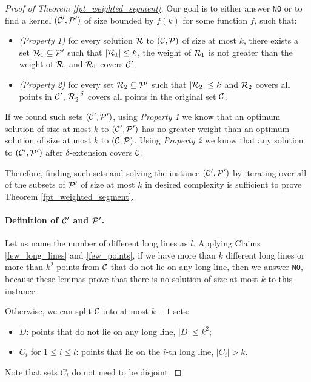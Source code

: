 \begin{proof}[Proof of Theorem \ref{fpt_weighted_segment}]
Our goal is to either answer \texttt{NO} or to find a kernel
$(\mathcal{C}',\mathcal{P}')$ of size bounded by $f(k)$ for some function $f$, such that:
\begin{itemize}
\item \textit{(Property 1)} for every solution
$\mathcal{R}$ to $(\mathcal{C},\mathcal{P})$ of size at most $k$,
there exists a set $\mathcal{R}_1 \subseteq \mathcal{P}'$ such that
$|\mathcal{R}_1| \le k$, the weight of $\mathcal{R}_1$ is not greater than the weight of $\mathcal{R}$,
and $\mathcal{R}_1$ covers $\mathcal{C}'$;
\item \textit{(Property 2)}
for every set $\mathcal{R}_2 \subseteq \mathcal{P}'$ such that $|\mathcal{R}_2| \le k$
and $\mathcal{R}_2$ covers all points in $\mathcal{C}'$, $\mathcal{R}_2^{+\delta}$
covers all points in the original set $\mathcal{C}$.
\end{itemize}

If we found such sets $(\mathcal{C}',\mathcal{P}')$,
using \textit{Property 1} we know that an optimum solution 
of size at most $k$ to $(\mathcal{C}',\mathcal{P}')$
has no greater weight than an optimum solution
of size at most $k$ to $(\mathcal{C},\mathcal{P})$.
Using \textit{Property 2} we know that
any solution to $(\mathcal{C}',\mathcal{P}')$
after $\delta$-extension covers $\mathcal{C}$.

Therefore, finding such sets 
and solving the instance $(\mathcal{C}',\mathcal{P}')$
by iterating over all of the subsets of $\mathcal{P}'$
of size at most $k$
in desired complexity
is sufficient to prove Theorem \ref{fpt_weighted_segment}.

\paragraph{Definition of $\mathcal{C}'$ and $\mathcal{P}'$.}
Let us name the number of different long lines as $l$.
Applying Claims \ref{few_long_lines} and \ref{few_points},
if we have more than $k$ different long lines
or more than $k^2$ points from $\mathcal{C}$
that do not lie on any long line, then we answer \texttt{NO},
because these lemmas prove that there is no solution of size at most $k$
to this instance.

Otherwise, we can split $\mathcal{C}$ into at most $k+1$ sets:
\begin{itemize}
\item $D$: points that do not lie on any long line, $|D| \le k^2$;
\item $C_i$ for $1 \le i \le l$: points that lie on the $i$-th long line, $|C_i| > k$.
\end{itemize}
Note that sets $C_i$ do not need to be disjoint.


\end{proof}
